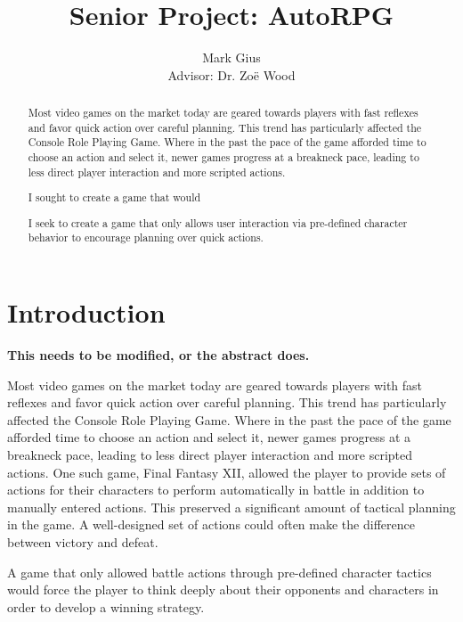 \documentclass[11pt]{article}
\begin{document}
\author{Mark Gius\vspace{10pt} \\
        Advisor: Dr. Zo\"e Wood
        }
\title{Senior Project: AutoRPG}
\maketitle

\begin{abstract}
Most video games on the market today are geared towards players with fast reflexes and favor quick action over careful planning. This trend has particularly affected the Console Role Playing Game.  Where in the past the pace of the game afforded time to choose an action and select it, newer games progress at a breakneck pace, leading to less direct player interaction and more scripted actions.

I sought to create a game that would 

I seek to create a game that only allows user interaction via pre-defined character behavior to encourage planning over quick actions.
\end{abstract}

\doublespacing
\section{Introduction}

\textbf{This needs to be modified, or the abstract does.}

Most video games on the market today are geared towards players with fast reflexes and favor quick action over careful planning. This trend has particularly affected the Console Role Playing Game.  Where in the past the pace of the game afforded time to choose an action and select it, newer games progress at a breakneck pace, leading to less direct player interaction and more scripted actions.  One such game, Final Fantasy XII, allowed the player to provide sets of actions for their characters to perform automatically in battle in addition to manually entered actions. \cite{Gambits} This preserved a significant amount of tactical planning in the game. A well-designed set of actions could often make the difference between victory and defeat.

A game that only allowed battle actions through pre-defined character tactics would force the player to think deeply about their opponents and characters in order to develop a winning strategy. 
\end{document}
